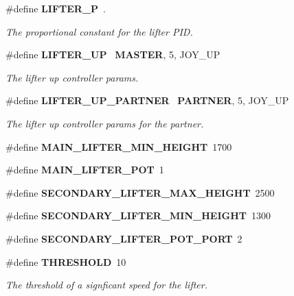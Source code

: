 \begin{DoxyCompactItemize}
\#define \textbf{ L\+I\+F\+T\+E\+R\+\_\+P}~.
\begin{DoxyCompactList}\small\item\em The proportional constant for the lifter P\+ID. \end{DoxyCompactList}\item 
\#define \textbf{ L\+I\+F\+T\+E\+R\+\_\+\+UP}~\textbf{ M\+A\+S\+T\+ER}, 5, J\+O\+Y\+\_\+\+UP
\begin{DoxyCompactList}\small\item\em The lifter up controller params. \end{DoxyCompactList}\item 
\#define \textbf{ L\+I\+F\+T\+E\+R\+\_\+\+U\+P\+\_\+\+P\+A\+R\+T\+N\+ER}~\textbf{ P\+A\+R\+T\+N\+ER}, 5, J\+O\+Y\+\_\+\+UP
\begin{DoxyCompactList}\small\item\em The lifter up controller params for the partner. \end{DoxyCompactList}\item 
\#define \textbf{ M\+A\+I\+N\+\_\+\+L\+I\+F\+T\+E\+R\+\_\+\+M\+I\+N\+\_\+\+H\+E\+I\+G\+HT}~1700
\item 
\#define \textbf{ M\+A\+I\+N\+\_\+\+L\+I\+F\+T\+E\+R\+\_\+\+P\+OT}~1
\item 
\#define \textbf{ S\+E\+C\+O\+N\+D\+A\+R\+Y\+\_\+\+L\+I\+F\+T\+E\+R\+\_\+\+M\+A\+X\+\_\+\+H\+E\+I\+G\+HT}~2500
\item 
\#define \textbf{ S\+E\+C\+O\+N\+D\+A\+R\+Y\+\_\+\+L\+I\+F\+T\+E\+R\+\_\+\+M\+I\+N\+\_\+\+H\+E\+I\+G\+HT}~1300
\item 
\#define \textbf{ S\+E\+C\+O\+N\+D\+A\+R\+Y\+\_\+\+L\+I\+F\+T\+E\+R\+\_\+\+P\+O\+T\+\_\+\+P\+O\+RT}~2
\item 
\#define \textbf{ T\+H\+R\+E\+S\+H\+O\+LD}~10
\begin{DoxyCompactList}\small\item\em The threshold of a signficant speed for the lifter. \end{DoxyCompactList}\end{DoxyCompactItemize}
